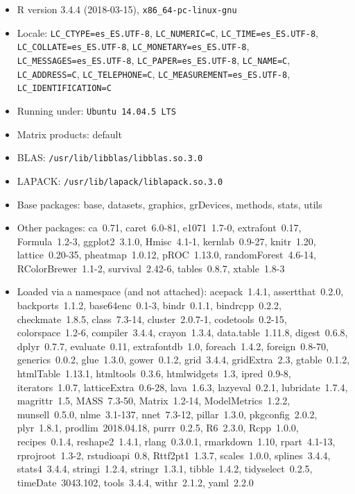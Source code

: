 \documentclass[12pt,spanish,a4paper]{article}
\numberwithin{equation}{section}
\begin{document}
\begin{itemize}\raggedright
  \item R version 3.4.4 (2018-03-15), \verb|x86_64-pc-linux-gnu|
  \item Locale: \verb|LC_CTYPE=es_ES.UTF-8|, \verb|LC_NUMERIC=C|, \verb|LC_TIME=es_ES.UTF-8|, \verb|LC_COLLATE=es_ES.UTF-8|, \verb|LC_MONETARY=es_ES.UTF-8|, \verb|LC_MESSAGES=es_ES.UTF-8|, \verb|LC_PAPER=es_ES.UTF-8|, \verb|LC_NAME=C|, \verb|LC_ADDRESS=C|, \verb|LC_TELEPHONE=C|, \verb|LC_MEASUREMENT=es_ES.UTF-8|, \verb|LC_IDENTIFICATION=C|
  \item Running under: \verb|Ubuntu 14.04.5 LTS|
  \item Matrix products: default
  \item BLAS: \verb|/usr/lib/libblas/libblas.so.3.0|
  \item LAPACK: \verb|/usr/lib/lapack/liblapack.so.3.0|
  \item Base packages: base, datasets, graphics, grDevices,
    methods, stats, utils
  \item Other packages: ca~0.71, caret~6.0-81, e1071~1.7-0,
    extrafont~0.17, Formula~1.2-3, ggplot2~3.1.0, Hmisc~4.1-1,
    kernlab~0.9-27, knitr~1.20, lattice~0.20-35, pheatmap~1.0.12,
    pROC~1.13.0, randomForest~4.6-14, RColorBrewer~1.1-2,
    survival~2.42-6, tables~0.8.7, xtable~1.8-3
  \item Loaded via a namespace (and not attached): acepack~1.4.1,
    assertthat~0.2.0, backports~1.1.2, base64enc~0.1-3,
    bindr~0.1.1, bindrcpp~0.2.2, checkmate~1.8.5, class~7.3-14,
    cluster~2.0.7-1, codetools~0.2-15, colorspace~1.2-6,
    compiler~3.4.4, crayon~1.3.4, data.table~1.11.8, digest~0.6.8,
    dplyr~0.7.7, evaluate~0.11, extrafontdb~1.0, foreach~1.4.2,
    foreign~0.8-70, generics~0.0.2, glue~1.3.0, gower~0.1.2,
    grid~3.4.4, gridExtra~2.3, gtable~0.1.2, htmlTable~1.13.1,
    htmltools~0.3.6, htmlwidgets~1.3, ipred~0.9-8,
    iterators~1.0.7, latticeExtra~0.6-28, lava~1.6.3,
    lazyeval~0.2.1, lubridate~1.7.4, magrittr~1.5, MASS~7.3-50,
    Matrix~1.2-14, ModelMetrics~1.2.2, munsell~0.5.0,
    nlme~3.1-137, nnet~7.3-12, pillar~1.3.0, pkgconfig~2.0.2,
    plyr~1.8.1, prodlim~2018.04.18, purrr~0.2.5, R6~2.3.0,
    Rcpp~1.0.0, recipes~0.1.4, reshape2~1.4.1, rlang~0.3.0.1,
    rmarkdown~1.10, rpart~4.1-13, rprojroot~1.3-2, rstudioapi~0.8,
    Rttf2pt1~1.3.7, scales~1.0.0, splines~3.4.4, stats4~3.4.4,
    stringi~1.2.4, stringr~1.3.1, tibble~1.4.2, tidyselect~0.2.5,
    timeDate~3043.102, tools~3.4.4, withr~2.1.2, yaml~2.2.0
\end{itemize}
\end{document}

